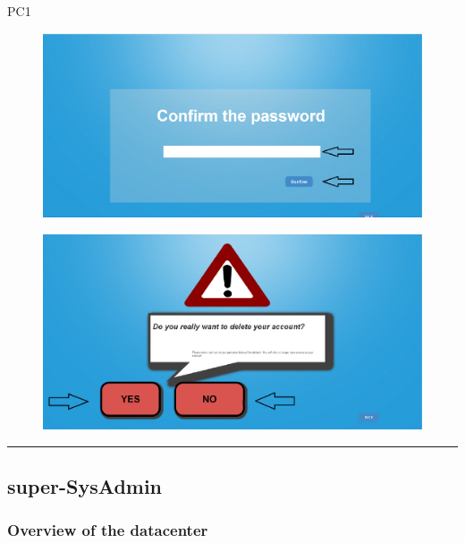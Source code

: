 \begin{lyxlist}{PC1}
\begin{figure}[H]
\centering
\includegraphics[width=170mm]{images/ComfirmField.eps}
\caption{\label{overflow}}
\end{figure}


\begin{figure}[H]
\centering
\includegraphics[width=170mm]{images/deletAcc2.eps}
\caption{\label{overflow}}
\end{figure}



\end{lyxlist}
\hrule




\subsection{super-SysAdmin}

\subsubsection{Overview of the datacenter}

